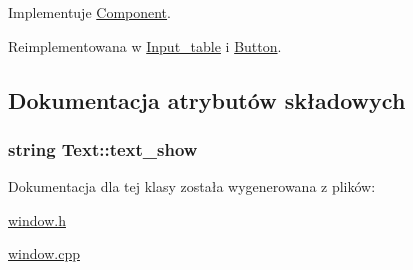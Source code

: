 Implementuje \hyperlink{classComponent_a247f6f0204b68a7efb9059cf709fe6ea}{Component}.



Reimplementowana w \hyperlink{classInput__table_ac48806d103ed557c4b9a4eac4a021cf3}{Input\+\_\+table} i \hyperlink{classButton_a2fc33ec22217562b28ac6f02bda26c6e}{Button}.



\subsection{Dokumentacja atrybutów składowych}
\subsubsection[{\texorpdfstring{text\+\_\+show}{text_show}}]{\setlength{\rightskip}{0pt plus 5cm}string Text\+::text\+\_\+show\hspace{0.3cm}{\ttfamily [protected]}}\hypertarget{classText_a3fd84b688c6971ba8626b910f0bc2ce3}{}\label{classText_a3fd84b688c6971ba8626b910f0bc2ce3}


Dokumentacja dla tej klasy została wygenerowana z plików\+:\begin{DoxyCompactItemize}
\item 
\hyperlink{window_8h}{window.\+h}\item 
\hyperlink{window_8cpp}{window.\+cpp}\end{DoxyCompactItemize}
